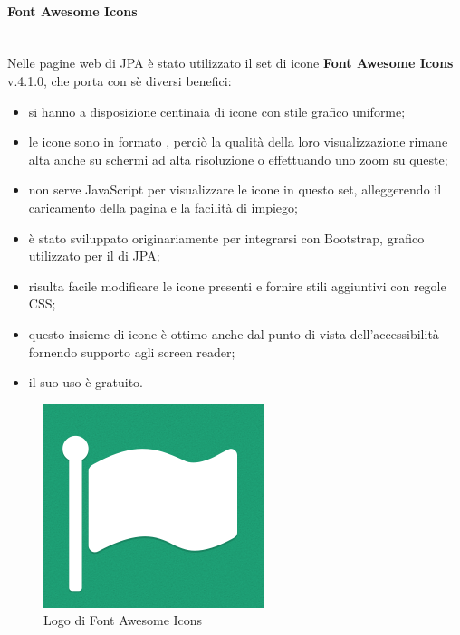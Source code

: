 \paragraph{Font Awesome Icons} \mbox{} \\

Nelle pagine web di JPA è stato utilizzato il set di icone \textbf{Font
Awesome Icons} v.4.1.0, che porta con sè diversi benefici:

\begin{itemize}
\item si hanno a disposizione centinaia di icone con stile grafico uniforme;
\item le icone sono in formato , perciò la qualità della loro
  visualizzazione rimane alta anche su schermi ad alta risoluzione o
  effettuando uno zoom su queste;
\item non serve JavaScript per visualizzare le icone in questo set,
  alleggerendo il caricamento della pagina e la facilità di impiego;
\item è stato sviluppato originariamente per integrarsi con Bootstrap,
   grafico utilizzato per il \FREND{} di JPA;
\item risulta facile modificare le icone presenti e fornire stili aggiuntivi
  con regole CSS;
\item questo insieme di icone è ottimo anche dal punto di vista
  dell'accessibilità fornendo supporto agli screen reader;
\item il suo uso è gratuito.
\end{itemize}

\begin{figure}[H]%
\centering
\includegraphics[width=.5\columnwidth]{immagini/logo-fa}
\caption{Logo di Font Awesome Icons}%
\label{fig:logo-fa}%
\end{figure}

